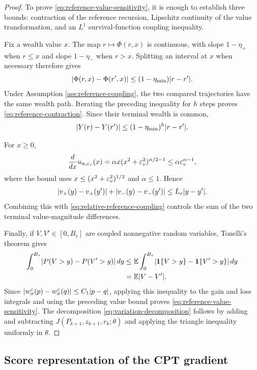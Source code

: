 \begin{proof}
To prove \eqref{eq:reference-value-sensitivity}, it is enough to establish three bounds: contraction of the reference recursion, Lipschitz continuity of the value transformation, and an $L^1$ survival-function coupling inequality.

Fix a wealth value $x$.  The map $r\mapsto\Phi(r,x)$ is continuous, with slope $1-\eta_+$ when $r\le x$ and slope $1-\eta_-$ when $r>x$.  Splitting an interval at $x$ when necessary therefore gives
\[
 \lvert\Phi(r,x)-\Phi(r',x)\rvert
 \le(1-\eta_{\min})\lvert r-r'\rvert.
\]
Under Assumption \ref{ass:reference-coupling}, the two compared trajectories have the same wealth path.  Iterating the preceding inequality for $h$ steps proves \eqref{eq:reference-contraction}.  Since their terminal wealth is common,
\begin{equation}\label{eq:relative-reference-coupling}
 \lvert Y(r)-Y(r')\rvert
 \le(1-\eta_{\min})^h\lvert r-r'\rvert.
\end{equation}

For $x\ge0$,
\[
 \frac{d}{dx}u_{\alpha,\varepsilon_v}(x)
 =\alpha x(x^2+\varepsilon_v^2)^{\alpha/2-1}
 \le\alpha\varepsilon_v^{\alpha-1},
\]
where the bound uses $x\le(x^2+\varepsilon_v^2)^{1/2}$ and $\alpha\le1$.  Hence
\[
 \lvert v_+(y)-v_+(y')\rvert
 +\lvert v_-(y)-v_-(y')\rvert
 \le L_v\lvert y-y'\rvert.
\]
Combining this with \eqref{eq:relative-reference-coupling} controls the sum of the two terminal value-magnitude differences.

Finally, if $V,V'\in[0,B_v]$ are coupled nonnegative random variables, Tonelli's theorem gives
\begin{align*}
 \int_0^{B_v}\lvert P(V>y)-P(V'>y)\rvert\,dy
 &\le \mathbb E\int_0^{B_v}
 \lvert\mathbf 1\{V>y\}-\mathbf 1\{V'>y\}\rvert\,dy\\
 &=\mathbb E\lvert V-V'\rvert.
\end{align*}
Since $\lvert w_\sigma^\varepsilon(p)-w_\sigma^\varepsilon(q)\rvert\le C_1\lvert p-q\rvert$, applying this inequality to the gain and loss integrals and using the preceding value bound proves \eqref{eq:reference-value-sensitivity}.  The decomposition \eqref{eq:variation-decomposition} follows by adding and subtracting $J(P_{k+1},z_{k+1},r_k;\theta)$ and applying the triangle inequality uniformly in $\theta$.
\end{proof}

\subsection{Score representation of the CPT gradient}

